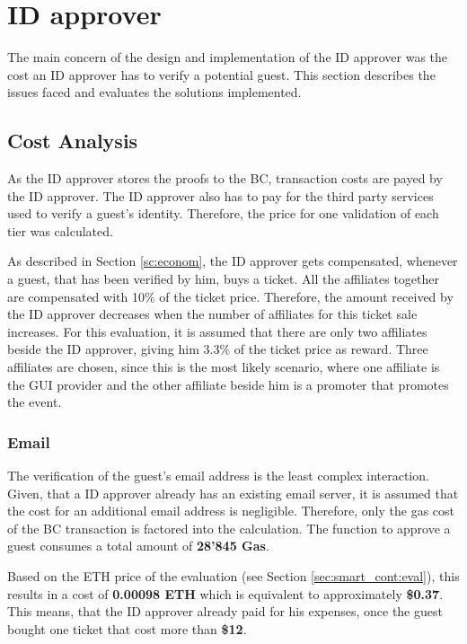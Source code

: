 \section{ID approver}\label{sec:identity-approver}
The main concern of the design and implementation of the ID approver was the cost an ID approver has to verify a potential guest. This section describes the issues faced and evaluates the solutions implemented.

\subsection{Cost Analysis}
As the ID approver stores the proofs to the BC, transaction costs are payed by the ID approver. The ID approver also has to pay for the third party services used to verify a guest's identity. Therefore, the price for one validation of each tier was calculated.

As described in Section \ref{sc:econom}, the ID approver gets compensated, whenever a guest, that has been verified by him, buys a ticket. All the affiliates together are compensated with 10\% of the ticket price. Therefore, the amount received by the ID approver decreases when the number of affiliates for this ticket sale increases. For this evaluation, it is assumed that there are only two affiliates beside the ID approver, giving him 3.3\% of the ticket price as reward. Three affiliates are chosen, since this is the most likely scenario, where one affiliate is the GUI provider and the other affiliate beside him is a promoter that promotes the event.

\subsubsection{Email}
The verification of the guest's email address is the least complex interaction. Given, that a ID approver already has an existing email server, it is assumed that the cost for an additional email address is negligible. Therefore, only the gas cost of the BC transaction is factored into the calculation. The function to approve a guest consumes a total amount of \textbf{28'845 Gas}. 

Based on the ETH price of the evaluation (see Section \ref{sec:smart_cont:eval}), this results in a cost of \textbf{0.00098 ETH} which is equivalent to approximately \textbf{\$0.37}. This means, that the ID approver already paid for his expenses, once the guest bought one ticket that cost more than \textbf{\$12}. 


